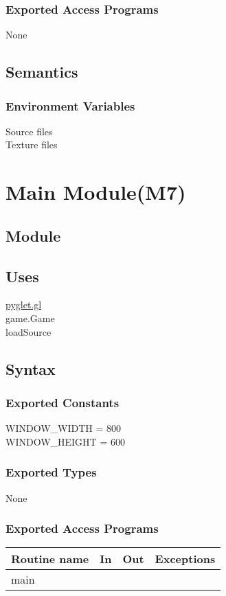 \documentclass{article}
\begin{document}
\subsubsection {Exported Access Programs}
None

\subsection {Semantics}

\subsubsection {Environment Variables}
Source files\\
Texture files

\newpage


\section {Main Module(M7)}

\subsection{Module}


\subsection {Uses}
\href{https://pyglet.readthedocs.io/en/latest/modules/gl.html}{pyglet.gl}\\
game.Game\\
loadSource

\subsection {Syntax}

\subsubsection {Exported Constants}
WINDOW\_WIDTH = 800\\
WINDOW\_HEIGHT = 600

\subsubsection {Exported Types}
None

\subsubsection {Exported Access Programs}
\begin{table}[!htbp]
\begin{tabular}{| l | l | l | l |}
\hline
\textbf{Routine name} & \textbf{In} & \textbf{Out} & \textbf{Exceptions}\\
\hline
main & ~ & ~ & ~\\
\hline
\end{tabular}
\end{table}
\end{document}
